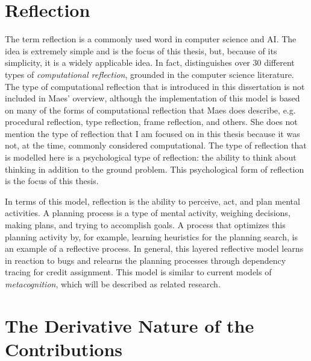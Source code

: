 \section{Reflection}

The term reflection is a commonly used word in computer science and
AI.  The idea is extremely simple and is the focus of this thesis,
but, because of its simplicity, it is a widely applicable idea.  In
fact, \cite{maes:1988} distinguishes over 30 different types of
\emph{computational reflection}, grounded in the computer science
literature.  The type of computational reflection that is introduced
in this dissertation is not included in Maes' overview, although the
implementation of this model is based on many of the forms of
computational reflection that Maes does describe, e.g. procedural
reflection, type reflection, frame reflection, and others.  She does
not mention the type of reflection that I am focused on in this thesis
because it was not, at the time, commonly considered computational.
The type of reflection that is modelled here is a psychological type
of reflection: the ability to think about thinking in addition to the
ground problem.  This psychological form of reflection is the focus of
this thesis.

In terms of this model, reflection is the ability to perceive, act,
and plan mental activities.  A planning process is a type of mental
activity, weighing decisions, making plans, and trying to accomplish
goals.  A process that optimizes this planning activity by, for
example, learning heuristics for the planning search, is an example of
a reflective process.  In general, this layered reflective model
learns in reaction to bugs and relearns the planning processes through
dependency tracing for credit assignment.  This model is similar to
current models of \emph{metacognition}, which will be described as
related research.

\section{The Derivative Nature of the Contributions}

